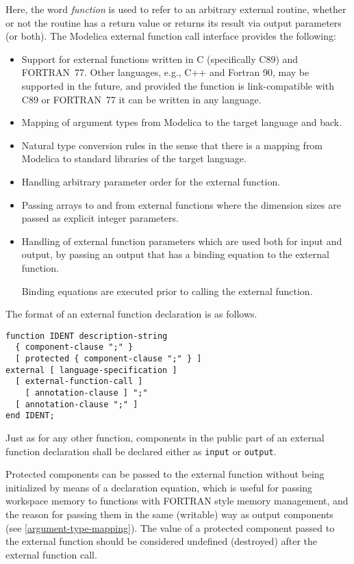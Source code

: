 Here, the word \emph{function} is used to refer to an arbitrary external routine, whether or not the routine has a return value or returns its result via output parameters (or both).
The Modelica external function call interface provides the following:
\begin{itemize}
\item
  Support for external functions written in C (specifically C89) and FORTRAN~77.
  Other languages, e.g., C++ and Fortran 90, may be supported in the future, and provided the function is link-compatible with C89 or FORTRAN~77 it can be written in any language.
\item
  Mapping of argument types from Modelica to the target language and
  back.
\item
  Natural type conversion rules in the sense that there is a mapping from Modelica to standard libraries of the target language.
\item
  Handling arbitrary parameter order for the external function.
\item
  Passing arrays to and from external functions where the dimension sizes are passed as explicit integer parameters.
\item
  Handling of external function parameters which are used both for input and output, by passing an output that has a binding equation to the external function.
  \begin{nonnormative}
  Binding equations are executed prior to calling the external function.
  \end{nonnormative}
\end{itemize}

The format of an external function declaration is as follows.
\begin{lstlisting}[language=grammar]
function IDENT description-string
  { component-clause ";" }
  [ protected { component-clause ";" } ]
external [ language-specification ]
  [ external-function-call ]
    [ annotation-clause ] ";"
  [ annotation-clause ";" ]
end IDENT;
\end{lstlisting}%

Just as for any other function, components in the public part of an external function declaration shall be declared either as {\lstinline!input!} or {\lstinline!output!}.

Protected components can be passed to the external function without being initialized by means of a declaration equation, which is useful for passing workspace memory to functions with FORTRAN style memory management, and the reason for passing them in the same (writable) way as output components (see \cref{argument-type-mapping}).
The value of a protected component passed to the external function should be considered undefined (destroyed) after the external function call.

